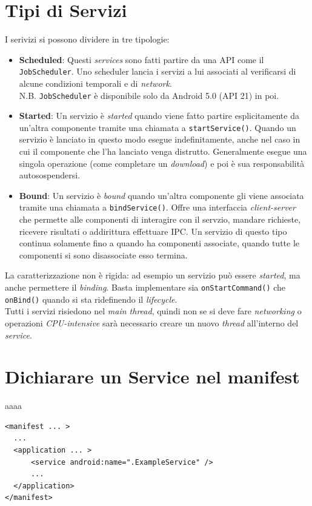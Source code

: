 \section{Tipi di Servizi}
I serivizi si possono dividere in tre tipologie:
\begin{itemize}
	\item \textbf{Scheduled}: Questi \textit{services} sono fatti partire da una API come il \texttt{JobScheduler}. Uno scheduler lancia i servizi a lui associati al verificarsi di alcune condizioni temporali e di \textit{network}.\\
	N.B. \texttt{JobScheduler} è disponibile solo da Android 5.0 (API 21) in poi.
	\item \textbf{Started}: Un servizio è \textit{started} quando viene fatto partire esplicitamente da un'altra componente tramite una chiamata a \texttt{startService()}. Quando un servizio è lanciato in questo modo esegue indefinitamente, anche nel caso in cui il componente che l'ha lanciato venga distrutto. Generalmente esegue una singola operazione (come completare un \textit{download}) e poi è sua responsabilità autosospendersi. 
	\item \textbf{Bound}: Un servizio è \textit{bound} quando un'altra componente gli viene associata tramite una chiamata a \texttt{bindService()}. Offre una interfaccia \textit{client-server} che permette alle componenti di interagire con il servzio, mandare richieste, ricevere risultati o addirittura effettuare IPC. Un servizio di questo tipo continua solamente fino a quando ha componenti associate, quando tutte le componenti si sono disassociate esso termina.
\end{itemize}


La caratterizzazione non è rigida: ad esempio un servizio può essere \textit{started}, ma anche permettere il \textit{binding}. Basta implementare sia \texttt{onStartCommand()} che \texttt{onBind()} quando si sta ridefinendo il \textit{lifecycle}.\\
Tutti i servizi risiedono nel \textit{main thread}, quindi non se si deve fare \textit{networking} o operazioni \textit{CPU-intensive} sarà necessario creare un nuovo \textit{thread} all'interno del \textit{service}.

\section{Dichiarare un Service nel manifest}
aaaa
\begin{lstlisting}[frame=single]
<manifest ... >
  ...
  <application ... >
      <service android:name=".ExampleService" />
      ...
  </application>
</manifest>
\end{lstlisting}